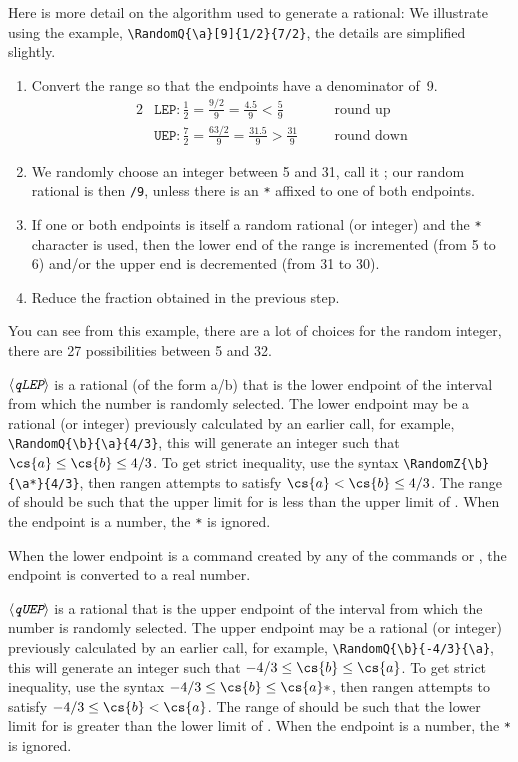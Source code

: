 \documentclass[12pt]{article}
\def\anglemeta#1{\ensuremath{\langle\textit{\texttt{#1}}\rangle}}
\def\meta#1{\textit{\texttt{#1}}}
\let\meta\anglemeta
\let\pkg\textsf
\begin{document}
\begin{description}
Here is more detail on the algorithm used to generate a rational: We illustrate
using the example, \verb!\RandomQ{\a}[9]{1/2}{7/2}!, the details are simplified slightly.
\begin{enumerate}
    \item Convert the range so that the endpoints have a denominator of~9.
\begin{alignat*}{2}
    &\texttt{LEP}: \frac{1}{2}= \frac{9/2}{9}=\frac{4.5}{9}< \frac{5}{9}&&\quad\text{round up} \\[1em]
    &\texttt{UEP}: \frac{7}{2}= \frac{63/2}{9}=\frac{31.5}{9}>\frac{31}{9}&&\quad\text{round down}
\end{alignat*}
\item We randomly choose an integer between 5 and 31, call it ; our random
rational is then \texttt{/9}, unless there is an \texttt{*} affixed to one of
both endpoints.
\item If one or both endpoints is itself a random rational (or integer) and the \texttt{*}
character is used, then the lower end of the range is incremented (from 5 to 6) and/or
the upper end is decremented (from 31 to 30).
\item Reduce the fraction obtained in the previous step.
\end{enumerate}

You can see from this example, there are a lot of choices for the random
integer, there are 27 possibilities between 5 and 32.

\item\1 \meta{qLEP} is a rational (of the form a/b) that is the lower
    endpoint of the interval from which the number is randomly selected.
    The lower endpoint may be a rational (or integer) previously calculated
    by an earlier  call, for example,
    \verb!\RandomQ{\b}{\a}{4/3}!, this will generate an integer  such
    that $\cs{a}\le\cs{b}\le4/3$. To get strict inequality, use the syntax
    \verb!\RandomZ{\b}{\a*}{4/3}!, then \pkg{rangen} attempts to satisfy
    $\cs{a}<\cs{b}\le4/3$. The range of  should be such that the
    upper limit for  is less than the upper limit of . When the
    endpoint is a number, the \texttt{*} is ignored.\smallskip

    When the lower endpoint is a command created by any of the commands
    \cs{Random\meta{\upshape{Z|Q|R|L}}} or \cs{define\meta{\upshape{Z|Q|R}}},
    the endpoint is converted to a real number.

\item\1\meta{qUEP} is a rational that is the upper endpoint of the interval
    from which the number is randomly selected. The upper endpoint may be a
    rational  (or integer) previously calculated by an earlier 
    call, for example, \verb!\RandomQ{\b}{-4/3}{\a}!, this will generate an
    integer  such that $-4/3\le\cs{b}\le\cs{a}$. To get strict
    inequality, use the syntax $-4/3\le\cs{b}\le\cs{a}*$, then \pkg{rangen}
    attempts to satisfy $-4/3\le\cs{b}<\cs{a}$. The range of  should
    be such that the lower limit for  is greater than the lower limit
    of . When the endpoint is a number, the \texttt{*} is
    ignored.\smallskip


\end{description}
\end{document}
